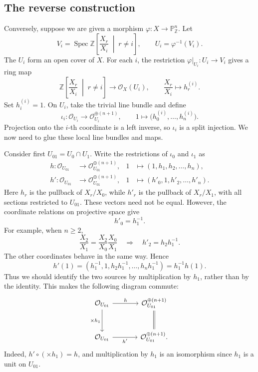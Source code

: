 \documentclass{article}
\theoremstyle{definition}
\theoremstyle{remark}
\theoremstyle{plain}
\DeclareMathOperator{\Spec}{Spec}
\newcommand{\Z}{\mathbb{Z}}
\renewcommand{\P}{\mathbb{P}}
\begin{document}

\subsection*{The reverse construction}

Conversely, suppose we are given a morphism
\(\varphi:X\to\P^n_\Z\). Let
\[
    V_i=\Spec\Z\left[
        \frac{X_r}{X_i}\;\middle|\;r\ne i
    \right],
    \qquad
    U_i=\varphi^{-1}(V_i).
\]
The \(U_i\) form an open cover of \(X\). For each \(i\), the
restriction \(\varphi|_{U_i}:U_i\to V_i\) gives a ring map
\[
    \Z\left[
        \frac{X_r}{X_i}\;\middle|\;r\ne i
    \right]
    \longrightarrow\mathcal O_X(U_i),
    \qquad
    \frac{X_r}{X_i}\longmapsto h_r^{(i)}.
\]
Set \(h_i^{(i)}=1\). On \(U_i\), take the trivial line bundle
and define
\[
    \iota_i:\mathcal O_{U_i}
    \longrightarrow\mathcal O_{U_i}^{\oplus(n+1)},
    \qquad
    1\longmapsto
    \bigl(h_0^{(i)},\ldots,h_n^{(i)}\bigr).
\]
Projection onto the \(i\)-th coordinate is a left inverse, so
\(\iota_i\) is a split injection. We now need to glue these
local line bundles and maps.

Consider first \(U_{01}=U_0\cap U_1\). Write the restrictions
of \(\iota_0\) and \(\iota_1\) as
\[
    \begin{aligned}
        h:\mathcal O_{U_{01}}
        &\longrightarrow\mathcal O_{U_{01}}^{\oplus(n+1)},
        &1&\longmapsto(1,h_1,h_2,\ldots,h_n),\\
        h':\mathcal O_{U_{01}}
        &\longrightarrow\mathcal O_{U_{01}}^{\oplus(n+1)},
        &1&\longmapsto(h'_0,1,h'_2,\ldots,h'_n).
    \end{aligned}
\]
Here \(h_r\) is the pullback of \(X_r/X_0\), while \(h'_r\)
is the pullback of \(X_r/X_1\), with all sections restricted
to \(U_{01}\). These vectors need not be equal. However,
the coordinate relations on projective space give
\[
    h'_0=h_1^{-1}.
\]
For example, when \(n\ge2\),
\[
    \frac{X_2}{X_1}
    =
    \frac{X_2}{X_0}\frac{X_0}{X_1}
    \quad\Longrightarrow\quad
    h'_2=h_2h_1^{-1}.
\]
The other coordinates behave in the same way. Hence
\[
    h'(1)
    =
    (h_1^{-1},1,h_2h_1^{-1},\ldots,h_nh_1^{-1})
    =
    h_1^{-1}h(1).
\]
Thus we should identify the two sources by multiplication
by \(h_1\), rather than by the identity. This makes the
following diagram commute:
\[
\begin{tikzcd}[column sep=large,row sep=large]
    \mathcal O_{U_{01}}
        \arrow[r,"h"]
        \arrow[d,"\times h_1"']
    & \mathcal O_{U_{01}}^{\oplus(n+1)}
        \arrow[d,equal]\\
    \mathcal O_{U_{01}}
        \arrow[r,"h'"']
    & \mathcal O_{U_{01}}^{\oplus(n+1)}.
\end{tikzcd}
\]
Indeed, \(h'\circ(\times h_1)=h\), and multiplication by
\(h_1\) is an isomorphism since \(h_1\) is a unit on
\(U_{01}\).
\end{document}
